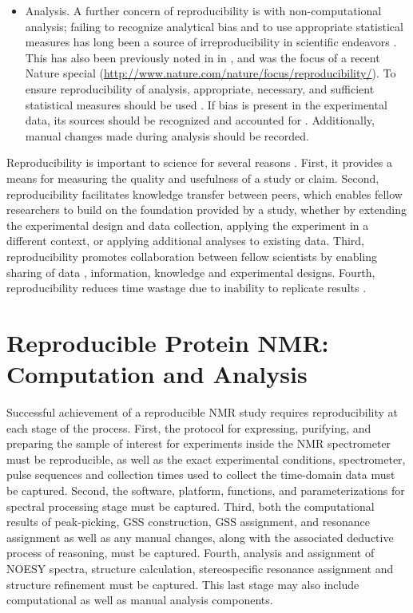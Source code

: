 \begin{itemize}
  \item Analysis.  A further concern of reproducibility is with 
  non-computational analysis; failing to recognize analytical bias and to 
  use appropriate statistical measures has long been a source of 
  irreproducibility in scientific endeavors \cite{sackett1979bias}.
  This has also been previously noted in \cite{ioannidis2005most} 
  in \cite{nuzzo2014statistical, begley2013reproducibility}, 
  and was the focus of a recent Nature special 
  (\url{http://www.nature.com/nature/focus/reproducibility/}).
  To ensure reproducibility of analysis, appropriate, necessary, and sufficient
  statistical measures should be used
  \cite{pashler2012replicability, vaux2012numbers}.
  If bias is present in the experimental data, its sources should be recognized
  and accounted for \cite{macarthur2012reproducibility, wagenmakers2012agenda}.
  Additionally, manual changes made during analysis should be recorded.

\end{itemize}

Reproducibility is important to science for several reasons 
\cite{borgman2012conundrum}.  First, it 
provides a means for measuring the quality and usefulness of a study or 
claim.  Second, reproducibility facilitates knowledge transfer between 
peers, which enables fellow researchers to build on the foundation provided 
by a study, whether by extending the experimental design and data collection, 
applying the experiment in a different context, or applying additional analyses 
to existing data.  Third, reproducibility promotes collaboration between fellow 
scientists by enabling sharing of data \cite{rung2013reuse}, 
information, knowledge and experimental 
designs.  Fourth, reproducibility reduces time wastage due to inability to 
replicate results 
\cite{ioannidis2005most, mullard2011reliability, prinz2011reproducibility,
begley2012drug}. 


\section{Reproducible Protein NMR:  Computation and Analysis}
Successful achievement of a reproducible NMR study requires reproducibility at 
each stage of the process.  First, the protocol for expressing, purifying, and 
preparing the sample of interest for experiments inside the NMR spectrometer 
must be reproducible, as well as the exact experimental conditions, 
spectrometer, pulse sequences and collection times used to collect the 
time-domain data must be captured.  Second, the software, platform, functions, 
and parameterizations for spectral processing stage must be captured.  
Third, both the computational results of peak-picking, GSS construction,
GSS assignment, and resonance assignment as well as any manual changes, 
along with the associated deductive process of reasoning, must be captured.  
Fourth, analysis and assignment of NOESY spectra, structure calculation, 
stereospecific resonance assignment and structure refinement must be captured.  
This last stage may also include computational as well as manual analysis 
components.  

